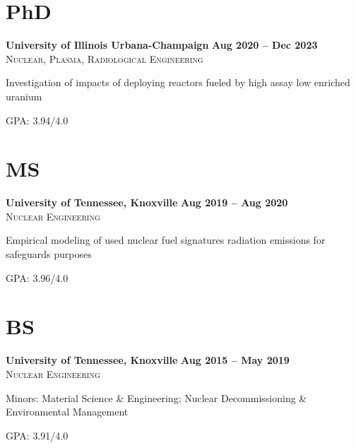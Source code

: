 \documentclass[margin,line]{resume}
\begin{document}
\begin{resume}
    \section{\mysidestyle PhD}
    \textbf{University of Illinois Urbana-Champaign} \hfill \textbf{Aug 2020 -- Dec 2023}\\%
    \textsc{Nuclear, Plasma, Radiological Engineering}\hfill
    \begin{list2}
        \item Investigation of impacts of deploying reactors fueled by high 
        assay low enriched uranium
        \item GPA: 3.94/4.0
    \end{list2}\vspace{-4mm}
    
    \section{\mysidestyle MS}
    \textbf{University of Tennessee, Knoxville} \hfill\textbf{Aug 2019 -- Aug 2020}\\%
    \textsc{Nuclear Engineering}\hfill
    \begin{list2}
        \item Empirical modeling of used nuclear fuel signatures radiation emissions for safeguards purposes
        \item GPA: 3.96/4.0
    \end{list2}\vspace{-4mm}
    \section{\mysidestyle BS}
    \textbf{University of Tennessee, Knoxville} \hfill\textbf{Aug 2015 -- May 2019}\\%
    \textsc{Nuclear Engineering}\hfill
    \begin{list2}
        \item Minors: Material Science \& Engineering; Nuclear Decommissioning \& 
              Environmental Management
        \item GPA: 3.91/4.0
    \end{list2}\vspace{-5mm}
    

\end{resume}
\end{document}
